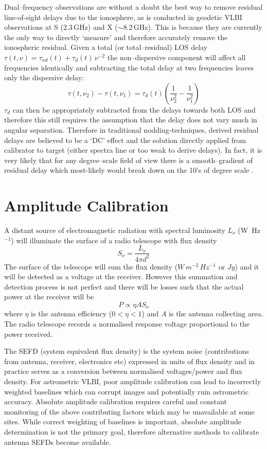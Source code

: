 		Dual--frequency observations are without a doubt the best way to remove residual line-of-sight delays due to the ionosphere, as is conducted in geodetic VLBI observations at S (2.3\,GHz) and X ($\sim8.2$\,GHz). This is because they are currently the only way to directly `measure' and therefore accurately remove the ionospheric residual. Given a total (or total--residual) LOS delay $\tau(t,\nu) = \tau_{nd}(t) + \tau_d(t)\,\nu^{-2}$ the non--dispersive component will affect all frequencies identically and subtracting the total delay at two frequencies leaves only the dispersive delay:
		\begin{equation}
		\tau(t,\nu_2) - \tau(t,\nu_1) = \tau_d(t)\left(\frac{1}{\nu_2^2}-\frac{1}{\nu_1^2}\right)
		\end{equation}
		$\tau_d$ can then be appropriately subtracted from the delays towards both LOS and therefore this still requires the assumption that the delay does not vary much in angular separation. Therefore in traditional nodding-techniques, derived residual delays are believed to be a `DC' effect and the solution directly applied from calibrator to target (either spectra line or too weak to derive delays). In fact, it is very likely that for any degree--scale field of view there is a smooth--gradient of residual delay which most-likely would break down on the 10's of degree scale \citep{Dodson2017}. %

\section{Amplitude Calibration} \label{sec:amplitudecalibration}
	A distant source of electromagnetic radiation with spectral luminosity $L_{\nu}$ (W~Hz$^{-1}$) will illuminate the surface of a radio telescope with flux density $$S_\nu=\frac{L_{\nu}}{4\pi d^2}$$ The surface of the telescope will sum the flux density ($W\,m^{-2}\,Hz^{-1}$ or $Jy$) and it will be detected as a voltage at the receiver. However this summation and detection process is not perfect and there will be losses such that the actual power at the receiver will be $$P\propto\eta A S_\nu $$ where $\eta$ is the antenna efficiency ($0<\eta<1$) and $A$ is the antenna collecting area. The radio telescope records a normalised response voltage proportional to the power received.
	
	The SEFD (system equivalent flux density) is the system noise (contributions from antenna, receiver, electronics etc) expressed in units of flux density and in practice serves as a conversion between normalised voltages/power and flux density. For astrometric VLBI, poor amplitude calibration can lead to incorrectly weighted baselines which can corrupt images and potentially ruin astrometric accuracy. Absolute amplitude calibration requires careful and constant monitoring of the above contributing factors which may be unavailable at some sites. While correct weighting of baselines is important, absolute amplitude determination is not the primary goal, therefore alternative methods to calibrate antenna SEFDs become available.

